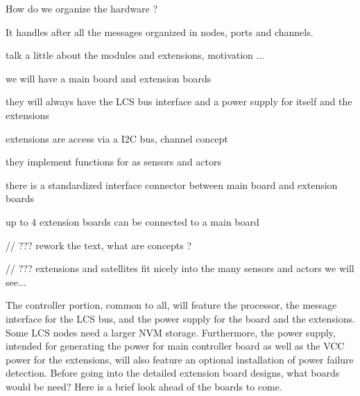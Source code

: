 
How do we organize the hardware ? 

It handles after all the messages organized in nodes, ports and channels.


talk a little about the modules and extensions, motivation ...

we will have a main board and extension boards

they will always have the LCS bus interface and a power supply for itself and the extensions

extensions are access via a I2C bus, channel concept

they implement functions for as sensors and actors

there is a standardized interface connector between main board and extension boards

up to 4 extension boards can be connected to a main board

// ??? rework the text, what are concepts ?

// ??? extensions and satellites fit nicely into the many sensors and actors we will see...

\begin{center}
\end{center}






The controller portion, common to all, will feature the processor, the message interface for the LCS bus, and the power supply for the board and the extensions. Some LCS nodes need a larger NVM storage. Furthermore, the power supply, intended for generating the power for main controller board as well as the VCC power for the extensions, will also feature an optional installation of power failure detection. Before going into the detailed extension board designs, what boards would be need? Here is a brief look ahead of the boards to come.

\begin{center}
\end{center}




